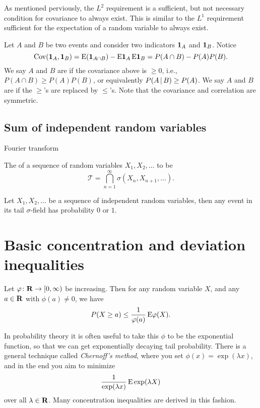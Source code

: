As mentioned perviously, the $L^2$ requirement is a sufficient, but not necessary condition for covariance to always exist. This is similar to the $L^1$ requirement sufficient for the expectation of a random variable to always exist.

Let $A$ and $B$ be two events and consider two indicators $\mathbf{1}_A$ and $\mathbf{1}_B$. Notice \[
    \operatorname{Cov}(\mathbf{1}_A,\mathbf{1}_B) = \mathop{}\!\mathrm{E}(\mathbf{1}_{A\cap B}) - \mathop{}\!\mathrm{E}\mathbf{1}_{A} \mathop{}\!\mathrm{E}\mathbf{1}_{B} = P(A\cap B) - P(A) P(B).
\]
We say $A$ and $B$ are  if the covariance above is $\geq 0$, i.e., $P(A\cap B) \geq P(A) P(B)$, or equivalently $P(A \,|\, B) \geq P(A)$. We say $A$ and $B$ are  if the $\geq$'s are replaced by $\leq$'s. Note that the covariance and correlation are symmetric.

\subsection{Sum of independent random variables}
Fourier transform

The  of a sequence of random variables $X_1,X_2,\dotsc$ to be \[
    \mathcal{T} = \bigcap_{n=1}^\infty \sigma(X_n,X_{n+1},\dotsc).
\]

\begin{namedthm} \label{thm:K-01-law}
    Let $X_1,X_2,\dotsc$ be a sequence of independent random variables, then any event in its tail $\sigma$-field has probability $0$ or $1$.
\end{namedthm}

\begin{namedthm} \label{thm:HS-01-law}
    
\end{namedthm}

\section{Basic concentration and deviation inequalities}
\begin{namedthm}
    Let $\varphi\colon \mathbf{R} \to [0,\infty)$ be increasing. Then for any random variable $X$, and any $a\in \mathbf{R}$ with $\phi(a)\neq 0$, we have \[
        P(X \geq a) \leq \frac{1}{\varphi(a)}\mathop{}\!\mathrm{E} \varphi(X).
    \]
\end{namedthm}

In probability theory it is often useful to take this $\phi$ to be the exponential function, so that we can get exponentially decaying tail probability. There is a general technique called \emph{Chernoff's method}, where you set $\phi(x) = \exp(\lambda x)$, and in the end you aim to minimize \[\frac{1}{\exp(\lambda x)}\mathop{}\!\mathrm{E} \exp(\lambda X) \] over all $\lambda \in \mathbf{R}$. Many concentration inequalities are derived in this fashion.


